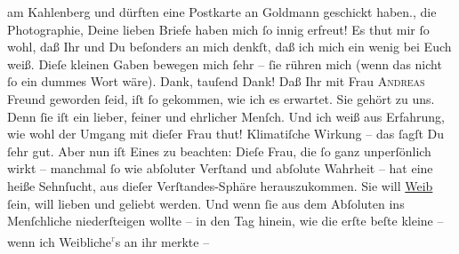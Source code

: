\begin{ledgroupsized}[t]{13cm}
{{{                  am Kahlenberg und dürften eine Postkarte an
                     Goldmann geschickt haben.}}}\label{K_L02735-1h}, die
               Photographie, Deine lieben Briefe haben mich ſo innig erfreut! Es thut mir ſo wohl,
               daß Ihr und Du beſonders an mich denkſt, daß ich mich ein wenig bei Euch weiß. Dieſe
               kleinen Gaben bewegen mich ſehr – ſie rühren mich (wenn das nicht {\pb}ſo ein dummes Wort wäre). Dank, tauſend Dank!\pend
           \pstart
           Daß Ihr mit Frau \textsc{Andreas} Freund geworden ſeid, iſt ſo gekommen, wie ich es erwartet. Sie gehört zu uns.
               Denn ſie iſt ein lieber, feiner und ehrlicher Menſch. Und ich weiß aus Erfahrung, wie wohl der Umgang mit
               dieſer Frau thut!
               Klimatiſche Wirkung – das ſagſt Du ſehr gut. Aber nun iſt Eines zu beachten: {\pb}Dieſe Frau, die ſo ganz unperſönlich wirkt – manchmal ſo wie
               abſoluter Verſtand und abſolute Wahrheit – hat eine heiße Sehnſucht, aus dieſer
               Verſtandes-Sphäre herauszukommen. Sie will \uline{Weib} ſein,
               will lieben und geliebt werden. Und wenn ſie aus dem Abſoluten ins Menſchliche
               niederſteigen wollte – in den Tag hinein, wie  die
               erſte beſte kleine {\pb}\label{K_L02735-55v}\label{K_L02735-55h} – wenn ich Weibliche\substVorne{}\textsuperscript{\textcolor{gray}{r}}\substDazwischen{}s\substHinten{} an ihr merkte – \label{K_L02735-2v}
\end{ledgroupsized}
